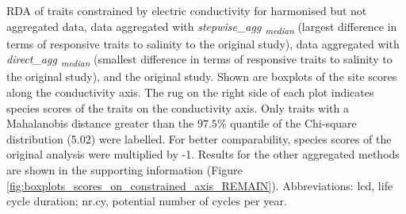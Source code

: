 \documentclass[12pt]{article}
\begin{document}
RDA of traits constrained by electric conductivity for harmonised but not aggregated data, data aggregated with \textit{stepwise\_agg \textsubscript{median}} (largest difference in terms of responsive traits to salinity to the original study), data aggregated with \textit{direct\_agg \textsubscript{median}} (smallest difference in terms of responsive traits to salinity to the original study), and the original study. Shown are boxplots of the site scores along the conductivity axis. The rug on the right side of each plot indicates species scores of the traits on the conductivity axis. Only traits with a Mahalanobis distance greater than the $97.5 \%$ quantile of the Chi-square distribution (5.02) were labelled. For better comparability, species scores of the original analysis were multiplied by -1. Results for the other aggregated methods are shown in the supporting information (Figure \ref{fig:boxplots_scores_on_constrained_axis_REMAIN}). Abbreviations: lcd, life cycle duration; nr.cy, potential number of cycles per year.
\end{document}
